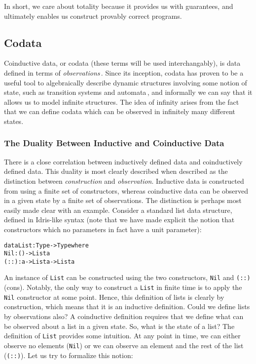 In short, we care about totality because it provides us with guarantees, and ultimately enables us construct provably correct programs.


\subsection{Codata}
\label{sec:codata}
Coinductive data, or codata (these terms will be used interchangably), is data defined in terms of \emph{observations}\,\citep{Jacobs97atutorial}. Since its inception, codata has proven to be a useful tool to algebraically describe dynamic structures involving some notion of state, such as transition systems and automata\,\citep{Jacobs97atutorial}, and informally we can say that it allows us to model infinite structures. The idea of infinity arises from the fact that we can define codata which can be observed in infinitely many different states.

\subsubsection{The Duality Between Inductive and Coinductive Data} There is a close correlation between inductively defined data and coinductively defined data. This duality is most clearly described when described as the distinction between \emph{construction} and \emph{observation}. Inductive data is constructed from using a finite set of constructors, whereas coinductive data  can be observed in a given state by a finite set of observations. The distinction is perhaps most easily made clear with an example. Consider a standard list data structure, defined in Idris-like syntax (note that we have made explicit the notion that constructors which no parameters in fact have a unit parameter):

\begin{alltt}
data List : Type -> Type where
  Nil  : () -> List a 
  (::) : a  -> List a -> List a
\end{alltt}

An instance of \texttt{List} can be constructed using the two constructors, \texttt{Nil} and \texttt{(::)} (cons). Notably, the only way to construct a \texttt{List} in finite time is to apply the \texttt{Nil} constructor at some point. Hence, this definition of lists is clearly by construction, which means that it is an inductive definition. Could we define lists by observations also? A coinductive definition requires that we define what can be observed about a list in a given state. So, what is the state of a list? The definition of \texttt{List} provides some intuition. At any point in time, we can either observe no elements (\texttt{Nil}) or we can observe an element and the rest of the list (\texttt{(::)}). Let us try to formalize this notion:

